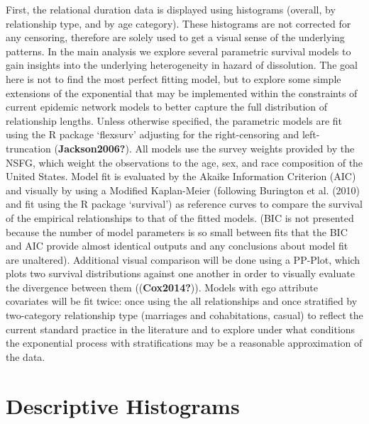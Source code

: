 \documentclass [11pt, proquest] {uwthesis}[2015/03/03]
\begin{document}
First, the relational duration data is displayed using histograms (overall, by relationship type, and by age category). These histograms are not corrected for any censoring, therefore are solely used to get a visual sense of the underlying patterns. In the main analysis we explore several parametric survival models to gain insights into the underlying heterogeneity in hazard of dissolution. The goal here is not to find the most perfect fitting model, but to explore some simple extensions of the exponential that may be implemented within the constraints of current epidemic network models to better capture the full distribution of relationship lengths. Unless otherwise specified, the parametric models are fit using the R package `flexsurv' adjusting for the right-censoring and left-truncation (\textbf{Jackson2006?}). All models use the survey weights provided by the NSFG, which weight the observations to the age, sex, and race composition of the United States. Model fit is evaluated by the Akaike Information Criterion (AIC) and visually by using a Modified Kaplan-Meier (following Burington et al. (2010) and fit using the R package `survival') as reference curves to compare the survival of the empirical relationships to that of the fitted models. (BIC is not presented because the number of model parameters is so small between fits that the BIC and AIC provide almost identical outputs and any conclusions about model fit are unaltered). Additional visual comparison will be done using a PP-Plot, which plots two survival distributions against one another in order to visually evaluate the divergence between them ((\textbf{Cox2014?})). Models with ego attribute covariates will be fit twice: once using the all relationships and once stratified by two-category relationship type (marriages and cohabitations, casual) to reflect the current standard practice in the literature and to explore under what conditions the exponential process with stratifications may be a reasonable approximation of the data.

\hypertarget{descriptive-histograms}{%
\section{Descriptive Histograms}\label{descriptive-histograms}}
\end{document}
